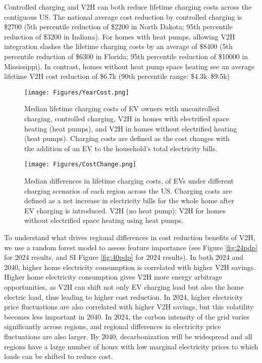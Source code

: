 \documentclass[11pt,preprint]{elsarticle}
\begin{document}
Controlled charging and V2H can both reduce lifetime charging costs across the contiguous US. The national average cost reduction by controlled charging is \$2700 (5th percentile reduction of \$2200 in North Dakota; 95th percentile reduction of \$3200 in Indiana). For homes with heat pumps, allowing V2H integration slashes the lifetime charging costs by an average of \$8400 (5th percentile reduction of \$6300 in Florida; 95th percentile reduction of \$10000 in Mississippi).  In contrast,  homes without heat pump space heating see an average lifetime V2H cost reduction of \$6.7k (90th percentile range: \$4.3k--\$9.5k)


\begin{figure*}[!ht]
    \centering
    \texttt{[image: Figures/YearCost.png]}
    \caption{Median lifetime charging costs of EV owners with uncontrolled charging, controlled charging, V2H in homes with electrified space heating (heat pumps), and V2H in homes without electrified heating (heat pumps). Charging costs are defined as the cost changes with the addition of an EV to the household's total electricity bills. }
    \label{fig:lifetimecosts}
\end{figure*}



\begin{figure*}[!ht]
    \centering
    \texttt{[image: Figures/CostChange.png]}
    \caption{Median differences in lifetime charging costs, of EVs under different charging scenarios of each region across the US. Charging costs are defined as a net increase in electricity bills for the whole home after EV charging is introduced. V2H (no heat pump): V2H for homes without electrified space heating using heat pumps.}
    \label{fig:costchange}
\end{figure*}

To understand what drives regional differences in cost reduction benefits of V2H, we use a random forest model to assess feature importance (see Figure \ref{fig:24pdp} for 2024 results, and SI Figure \ref{fig:40pdp} for 2024 results). In both 2024 and 2040, higher home electricity consumption is correlated with higher V2H savings. Higher home electricity consumption gives V2H more energy arbitrage opportunities, as V2H can shift not only EV charging load but also the home electric load, thus leading to higher cost reduction. In 2024, higher electricity price fluctuations are also correlated with higher V2H savings, but this volatility becomes less important in 2040. In 2024, the carbon intensity of the grid varies significantly across regions, and regional differences in electricity price fluctuations are also larger. By 2040, decarbonization will be widespread and all regions have a large number of hours with low marginal electricity prices to which loads can be shifted to reduce cost. 
\end{document}
